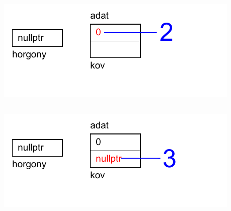 \begin{frame}
  \begin{columns}[c]
      \begin{exampleblock}{}
        
      \end{exampleblock}
      \includegraphics[width=\textwidth]{verem/verem03.pdf}
  \end{columns}
\end{frame}

\begin{frame}
  \begin{columns}[c]
      \begin{exampleblock}{}
        
      \end{exampleblock}
      \includegraphics[width=\textwidth]{verem/verem04.pdf}
  \end{columns}
\end{frame}

